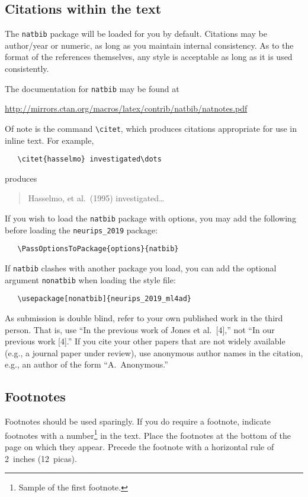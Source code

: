 \documentclass{article}
\begin{document}
\subsection{Citations within the text}

The \verb+natbib+ package will be loaded for you by default.  Citations may be
author/year or numeric, as long as you maintain internal consistency.  As to the
format of the references themselves, any style is acceptable as long as it is
used consistently.

The documentation for \verb+natbib+ may be found at
\begin{center}
  \url{http://mirrors.ctan.org/macros/latex/contrib/natbib/natnotes.pdf}
\end{center}
Of note is the command \verb+\citet+, which produces citations appropriate for
use in inline text.  For example,
\begin{verbatim}
   \citet{hasselmo} investigated\dots
\end{verbatim}
produces
\begin{quote}
  Hasselmo, et al.\ (1995) investigated\dots
\end{quote}

If you wish to load the \verb+natbib+ package with options, you may add the
following before loading the \verb+neurips_2019+ package:
\begin{verbatim}
   \PassOptionsToPackage{options}{natbib}
\end{verbatim}

If \verb+natbib+ clashes with another package you load, you can add the optional
argument \verb+nonatbib+ when loading the style file:
\begin{verbatim}
   \usepackage[nonatbib]{neurips_2019_ml4ad}
\end{verbatim}

As submission is double blind, refer to your own published work in the third
person. That is, use ``In the previous work of Jones et al.\ [4],'' not ``In our
previous work [4].'' If you cite your other papers that are not widely available
(e.g., a journal paper under review), use anonymous author names in the
citation, e.g., an author of the form ``A.\ Anonymous.''

\subsection{Footnotes}

Footnotes should be used sparingly.  If you do require a footnote, indicate
footnotes with a number\footnote{Sample of the first footnote.} in the
text. Place the footnotes at the bottom of the page on which they appear.
Precede the footnote with a horizontal rule of 2~inches (12~picas).
\end{document}
